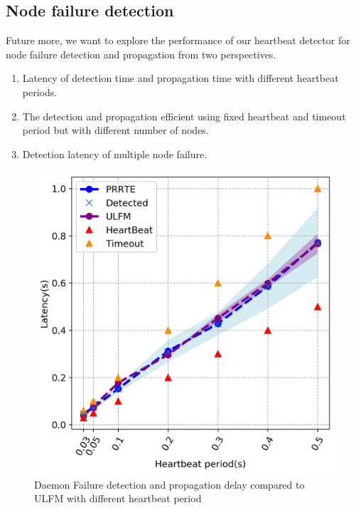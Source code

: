 \documentclass[sigconf]{acmart}
\begin{document}
\subsection{Node failure detection}
Future more, we want to explore the performance of our heartbeat detector  for node failure detection and propagation from two perspectives. 
\begin{enumerate}
  \item Latency of detection time and propagation time with different heartbeat periods.
  \item The detection and propagation efficient using fixed heartbeat and timeout period but with different number of nodes.
  \item Detection latency of multiple node failure.
\end{enumerate}

\begin{figure}[h]
  \centering
  \includegraphics[width=\linewidth]{PRRTE_ULFM_new_nodebug.png}
  \caption{Daemon Failure detection and propagation delay compared to ULFM with different heartbeat period}
\end{figure}
\end{document}
